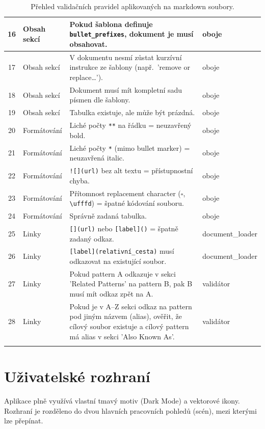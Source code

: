 \documentclass[12pt, a4paper]{article}
\begin{document}
\begin{small}
\begin{longtable}{|c|p{3.0cm}|p{8.5cm}|p{2.5cm}|}
16 & Obsah sekcí & Pokud šablona definuje \texttt{bullet\_prefixes}, dokument je musí obsahovat. & oboje \\ \hline
17 & Obsah sekcí & V dokumentu nesmí zůstat kurzívní instrukce ze šablony (např.\ 'remove or replace\ldots'). & oboje \\ \hline
18 & Obsah sekcí & Dokument musí mít kompletní sadu písmen dle šablony. & oboje \\ \hline
19 & Obsah sekcí & Tabulka existuje, ale může být prázdná. & oboje \\ \hline
20 & Formátování & Liché počty \texttt{**} na řádku = neuzavřený bold. & oboje \\ \hline
21 & Formátování & Liché počty \texttt{*} (mimo bullet marker) = neuzavřená italic. & oboje \\ \hline
22 & Formátování & \texttt{![](url)} bez alt textu = přístupnostní chyba. & oboje \\ \hline
23 & Formátování & Přítomnost replacement character ($\square$, \texttt{\textbackslash ufffd}) = špatné kódování souboru. & oboje \\ \hline
24 & Formátování & Správně zadaná tabulka. & oboje \\ \hline
25 & Linky & \texttt{[](url)} nebo \texttt{[label]()} = špatně zadaný odkaz. & document\_loader \\ \hline
26 & Linky & \texttt{[label](relativní\_cesta)} musí odkazovat na existující soubor. & document\_loader \\ \hline
27 & Linky & Pokud pattern A odkazuje v sekci 'Related Patterns' na pattern B, pak B musí mít odkaz zpět na A. & validátor \\ \hline
28 & Linky & Pokud je v A--Z sekci odkaz na pattern pod jiným názvem (alias), ověřit, že cílový soubor existuje a cílový pattern má alias v sekci 'Also Known As'. & validátor \\ \hline

\caption{Přehled validačních pravidel aplikovaných na markdown soubory.}
\label{tab:validation-rules}
\end{longtable}
\end{small}
\renewcommand{\arraystretch}{1.0}

\section{Uživatelské rozhraní}

Aplikace plně využívá vlastní tmavý motiv (Dark Mode) a vektorové ikony. 
Rozhraní je rozděleno do dvou hlavních pracovních pohledů (scén), mezi kterými lze přepínat.
\end{document}
